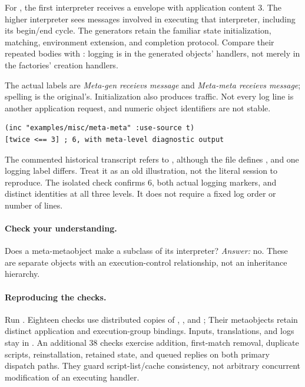 For \code{[twice <== 3]}, the first interpreter receives a
 envelope with application content 3.
The higher interpreter sees messages involved in executing that
interpreter, including its begin/end cycle.
The generators retain the familiar state initialization, matching,
environment extension, and completion protocol.
Compare their repeated bodies with : logging is in
the generated objects'  handlers, not merely in the
factories' creation handlers.

The actual labels are \emph{Meta-gen receievs message} and
\emph{Meta-meta receievs message}; spelling is the original's.
Initialization also produces traffic. Not every log line is another
application request, and numeric object identifiers are not stable.

\begin{codeblock}
\begin{lstlisting}
(inc "examples/misc/meta-meta" :use-source t)
[twice <== 3] ; 6, with meta-level diagnostic output
\end{lstlisting}
\end{codeblock}

The commented historical transcript refers to , although
the file defines , and one logging label differs.
Treat it as an old illustration, not the literal session to reproduce.
The isolated check confirms 6, both actual logging markers, and
distinct identities at all three levels. It does not require a fixed
log order or number of lines.

\paragraph{Check your understanding.}
Does a meta-metaobject make  a subclass of its interpreter?
\emph{Answer:} no. These are separate objects with an execution-control
relationship, not an inheritance hierarchy.

\paragraph{Reproducing the checks.}
Run . Eighteen checks use
distributed copies of , , and ;
Their metaobjects retain distinct application and execution-group bindings.
Inputs, translations, and logs stay in .
An additional 38 checks exercise addition, first-match removal, duplicate
scripts, reinstallation, retained state, and queued replies on both
primary dispatch paths. They guard script-list/cache consistency, not
arbitrary concurrent modification of an executing handler.
